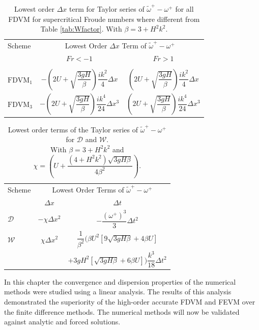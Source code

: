 \begin{table}
	\centering
	\begin{tabular}{l  c  c}
	\hline
		Scheme &\multicolumn{2}{c}{Lowest Order $\Delta x$ Term of $\widetilde{\omega}^+-\omega^+$} \T\B \\
			\cline{2-3} 
			& $Fr < - 1$&$ Fr >1$ \T\B  \\
		\hline & \\
		$\text{FDVM}_1$& $-\left(2U + \sqrt{\dfrac{3gH}{\beta}}\right)  \dfrac{ik^2}{4} \Delta x$ &  $\left(2U + \sqrt{\dfrac{3gH}{\beta}}\right)  \dfrac{ik^2}{4} \Delta x$  \T\B   \\
		$\text{FDVM}_3$& $-\left(2U + \sqrt{\dfrac{3gH}{\beta}} \right) \dfrac{ik^4}{24} \Delta x^3$ & $\left(2U + \sqrt{\dfrac{3gH}{\beta}} \right) \dfrac{ik^4}{24} \Delta x^3$  \T\B  \\
		\hline
	\end{tabular}
	\caption{Lowest order $\Delta x$ term for Taylor series of $\widetilde{\omega}^+-\omega^+$ for all FDVM for supercritical Froude numbers where different from Table \ref{tab:Wfactor}. With $\beta = 3 + H^2 k^2 $. }
	\label{tab:Wspatfactor} 
\end{table}
	
\begin{table}
	\centering
\begin{tabular}{l  c  c}
\hline
	Scheme & \multicolumn{2}{c}{Lowest Order Terms of $\widetilde{\omega}^+-\omega^+$} \T\B \\
	\cline{2-3}
	& $\Delta x$&$\Delta t$ \T\B \\
	\hline
	$\mathcal{D}$& $- \chi \Delta x^2$  &$ -\dfrac{\left(\omega^+\right)^3}{3}\Delta t^2$ \T\B  \\
	$\mathcal{W}$& $\chi\Delta x^2$  &$ \dfrac{1}{\beta^2}\Bigg( \beta U^2\left[9\sqrt{3gH \beta} + 4 \beta U\right]$ \\ & & $ + 3gH^2\left[\sqrt{3gH \beta} + 6 \beta U\right] \Bigg) \dfrac{k^3}{18 }\Delta t^2$  \T\B  \\ 
	\hline
\end{tabular}
	\caption{Lowest order terms of the Taylor series of $\widetilde{\omega}^+-\omega^+$ for $\mathcal{D}$ and $\mathcal{W}$. \\ With $\beta = 3 + H^2 k^2 $ and $\chi = \left(U + \dfrac{\left( 4 + H^2k^2\right)\sqrt{3gH\beta}}{4 \beta^2}\right)$. }
	\label{tab:WFDspatfactor} 
\end{table}
 
 \medskip
 
 In this chapter the convergence and dispersion properties of the numerical methods were studied using a linear analysis. The results of this analysis demonstrated the superiority of the high-order accurate FDVM and FEVM over the finite difference methods. The numerical methods will now be validated against analytic and forced solutions.